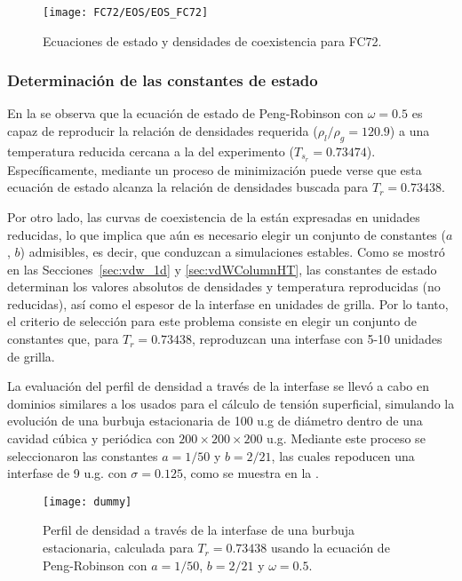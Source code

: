 \begin{figure}[ht]
	\centering
	\texttt{[image: FC72/EOS/EOS\_FC72]}
	\caption{Ecuaciones de estado y densidades de coexistencia para FC72.}
	\label{fig:eos_fc72}
\end{figure}


\subsubsection{Determinaci\'on de las constantes de estado}

En la  se observa que la ecuaci\'on de estado de Peng-Robinson con $\omega=0.5$ es capaz de reproducir la relaci\'on de densidades requerida ($\rho_l/\rho_g = 120.9$) a una temperatura reducida cercana a la del experimento ($T_{s_r}=0.73474$). Espec\'ificamente, mediante un proceso de minimizaci\'on puede verse que esta ecuaci\'on de estado alcanza la relaci\'on de densidades buscada para $T_r=0.73438$.

Por otro lado, las curvas de coexistencia de la  est\'an expresadas en unidades reducidas, lo que implica que a\'un es necesario elegir un conjunto de constantes ($a$, $b$) admisibles, es decir, que conduzcan a simulaciones estables. Como se mostr\'o en las Secciones~\ref{sec:vdw_1d} y \ref{sec:vdWColumnHT}, las constantes de estado determinan los valores absolutos de densidades y temperatura reproducidas (no reducidas), as\'i como el espesor de la interfase en unidades de grilla. Por lo tanto, el criterio de selecci\'on para este problema consiste en elegir  un conjunto de constantes que, para $T_r=0.73438$, reproduzcan una interfase con 5-10 unidades de grilla.

La evaluaci\'on del perfil de densidad a trav\'es de la interfase se llev\'o a cabo en dominios similares a los usados para el c\'alculo de tensi\'on superficial, simulando la evoluci\'on de una burbuja estacionaria de 100 u.g de di\'ametro dentro de una cavidad c\'ubica y peri\'odica con $200 \times 200 \times 200$ u.g. Mediante este proceso se seleccionaron las constantes $a=1/50$ y $b=2/21$, las cuales repoducen una interfase de 9 u.g. con $\sigma=0.125$, como se muestra en la .
\begin{figure}[ht]
	\centering
	\texttt{[image: dummy]}
	\caption{Perfil de densidad a trav\'es de la interfase de una burbuja estacionaria, calculada para $T_r=0.73438$ usando la ecuaci\'on de Peng-Robinson con $a=1/50$, $b=2/21$ y $\omega=0.5$.}
	\label{fig:rho_int_bubble}
\end{figure}



